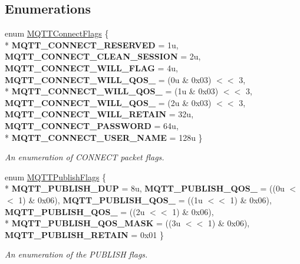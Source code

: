 \subsection*{Enumerations}
\begin{DoxyCompactItemize}
\item 
enum \hyperlink{group__packers_gad6fa84a96a940fe4eae6ffca1a6d945f}{M\+Q\+T\+T\+Connect\+Flags} \{ \\*
{\bfseries M\+Q\+T\+T\+\_\+\+C\+O\+N\+N\+E\+C\+T\+\_\+\+R\+E\+S\+E\+R\+V\+ED} = 1u, 
{\bfseries M\+Q\+T\+T\+\_\+\+C\+O\+N\+N\+E\+C\+T\+\_\+\+C\+L\+E\+A\+N\+\_\+\+S\+E\+S\+S\+I\+ON} = 2u, 
{\bfseries M\+Q\+T\+T\+\_\+\+C\+O\+N\+N\+E\+C\+T\+\_\+\+W\+I\+L\+L\+\_\+\+F\+L\+AG} = 4u, 
{\bfseries M\+Q\+T\+T\+\_\+\+C\+O\+N\+N\+E\+C\+T\+\_\+\+W\+I\+L\+L\+\_\+\+Q\+O\+S\+\_} = (0u \& 0x03) $<$$<$ 3, 
\\*
{\bfseries M\+Q\+T\+T\+\_\+\+C\+O\+N\+N\+E\+C\+T\+\_\+\+W\+I\+L\+L\+\_\+\+Q\+O\+S\+\_} = (1u \& 0x03) $<$$<$ 3, 
{\bfseries M\+Q\+T\+T\+\_\+\+C\+O\+N\+N\+E\+C\+T\+\_\+\+W\+I\+L\+L\+\_\+\+Q\+O\+S\+\_} = (2u \& 0x03) $<$$<$ 3, 
{\bfseries M\+Q\+T\+T\+\_\+\+C\+O\+N\+N\+E\+C\+T\+\_\+\+W\+I\+L\+L\+\_\+\+R\+E\+T\+A\+IN} = 32u, 
{\bfseries M\+Q\+T\+T\+\_\+\+C\+O\+N\+N\+E\+C\+T\+\_\+\+P\+A\+S\+S\+W\+O\+RD} = 64u, 
\\*
{\bfseries M\+Q\+T\+T\+\_\+\+C\+O\+N\+N\+E\+C\+T\+\_\+\+U\+S\+E\+R\+\_\+\+N\+A\+ME} = 128u
 \}\begin{DoxyCompactList}\small\item\em An enumeration of C\+O\+N\+N\+E\+CT packet flags. \end{DoxyCompactList}
\item 
enum \hyperlink{group__packers_gad38a41e1c497f9bcd2477c005f280b23}{M\+Q\+T\+T\+Publish\+Flags} \{ \\*
{\bfseries M\+Q\+T\+T\+\_\+\+P\+U\+B\+L\+I\+S\+H\+\_\+\+D\+UP} = 8u, 
{\bfseries M\+Q\+T\+T\+\_\+\+P\+U\+B\+L\+I\+S\+H\+\_\+\+Q\+O\+S\+\_} = ((0u $<$$<$ 1) \& 0x06), 
{\bfseries M\+Q\+T\+T\+\_\+\+P\+U\+B\+L\+I\+S\+H\+\_\+\+Q\+O\+S\+\_} = ((1u $<$$<$ 1) \& 0x06), 
{\bfseries M\+Q\+T\+T\+\_\+\+P\+U\+B\+L\+I\+S\+H\+\_\+\+Q\+O\+S\+\_} = ((2u $<$$<$ 1) \& 0x06), 
\\*
{\bfseries M\+Q\+T\+T\+\_\+\+P\+U\+B\+L\+I\+S\+H\+\_\+\+Q\+O\+S\+\_\+\+M\+A\+SK} = ((3u $<$$<$ 1) \& 0x06), 
{\bfseries M\+Q\+T\+T\+\_\+\+P\+U\+B\+L\+I\+S\+H\+\_\+\+R\+E\+T\+A\+IN} = 0x01
 \}\begin{DoxyCompactList}\small\item\em An enumeration of the P\+U\+B\+L\+I\+SH flags. \end{DoxyCompactList}
\end{DoxyCompactItemize}

